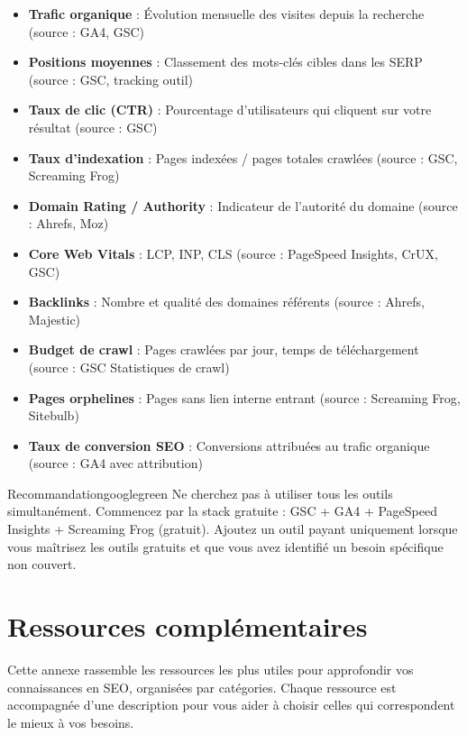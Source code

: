 \documentclass[12pt,a4paper,twoside]{report}
\begin{document}
\begin{itemize}
    \item \textbf{Trafic organique} : Évolution mensuelle des visites depuis la recherche (source : GA4, GSC)
    \item \textbf{Positions moyennes} : Classement des mots-clés cibles dans les SERP (source : GSC, tracking outil)
    \item \textbf{Taux de clic (CTR)} : Pourcentage d'utilisateurs qui cliquent sur votre résultat (source : GSC)
    \item \textbf{Taux d'indexation} : Pages indexées / pages totales crawlées (source : GSC, Screaming Frog)
    \item \textbf{Domain Rating / Authority} : Indicateur de l'autorité du domaine (source : Ahrefs, Moz)
    \item \textbf{Core Web Vitals} : LCP, INP, CLS (source : PageSpeed Insights, CrUX, GSC)
    \item \textbf{Backlinks} : Nombre et qualité des domaines référents (source : Ahrefs, Majestic)
    \item \textbf{Budget de crawl} : Pages crawlées par jour, temps de téléchargement (source : GSC Statistiques de crawl)
    \item \textbf{Pages orphelines} : Pages sans lien interne entrant (source : Screaming Frog, Sitebulb)
    \item \textbf{Taux de conversion SEO} : Conversions attribuées au trafic organique (source : GA4 avec attribution)
\end{itemize}

\begin{mybox}{Recommandation}{googlegreen}
Ne cherchez pas à utiliser tous les outils simultanément. Commencez par la stack gratuite : GSC + GA4 + PageSpeed Insights + Screaming Frog (gratuit). Ajoutez un outil payant uniquement lorsque vous maîtrisez les outils gratuits et que vous avez identifié un besoin spécifique non couvert.
\end{mybox}

\newpage
\chapter{Ressources complémentaires}
\label{app:resources}

Cette annexe rassemble les ressources les plus utiles pour approfondir vos connaissances en SEO, organisées par catégories. Chaque ressource est accompagnée d'une description pour vous aider à choisir celles qui correspondent le mieux à vos besoins.
\end{document}
